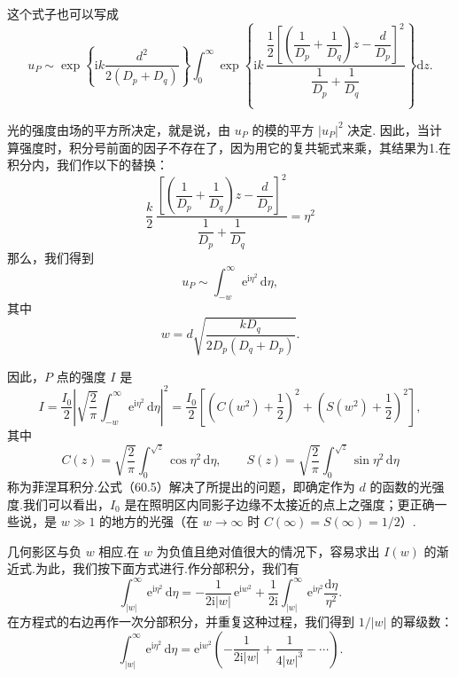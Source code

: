 这个式子也可以写成
\begin{equation}
  u_P\sim\exp\left\{\mathrm{i}k\frac{d^2}{2(D_p+D_q)}\right\}
  \int_0^{\infty}\exp\left\{\mathrm{i}k\,
  \frac{\dfrac{1}{2}\left[\left(\dfrac{1}{D_p}+\dfrac{1}{D_q}\right)z-\dfrac{d}{D_p}\right]^2}
       {\dfrac{1}{D_p}+\dfrac{1}{D_q}}\right\}\mathrm{d}z.
\end{equation}

光的强度由场的平方所决定，就是说，由 $u_P$ 的模的平方 $|u_P|^2$ 决定. 因此，当计算强度时，积分号前面的因子不存在了，因为用它的复共轭式来乘，其结果为1.在积分内，我们作以下的替换：
\begin{equation*}
  \frac{k}{2}\,
  \frac{\left[\left(\dfrac{1}{D_p}+\dfrac{1}{D_q}\right)z-\dfrac{d}{D_p}\right]^2}
       {\dfrac{1}{D_p}+\dfrac{1}{D_q}}=\eta^2
\end{equation*}
那么，我们得到
\begin{equation}
  u_P\sim\int_{-w}^{\infty}\mathrm{e}^{\mathrm{i}\eta^2}\,\mathrm{d}\eta,
\end{equation}
其中
\begin{equation}
  w=d\sqrt{\frac{kD_q}{2D_p(D_q+D_p)}}.
\end{equation}

因此，$P$ 点的强度 $I$ 是
\begin{equation}
  I=\frac{I_0}{2}\left|\sqrt{\frac{2}{\pi}}
  \int_{-w}^{\infty}\mathrm{e}^{\mathrm{i}\eta^2}\,\mathrm{d}\eta\right|^2
  =\frac{I_0}{2}\left[\left(C(w^2)+\frac{1}{2}\right)^2
  +\left(S(w^2)+\frac{1}{2}\right)^2\right],
\end{equation}
其中
\begin{equation*}
  C(z)=\sqrt{\frac{2}{\pi}}\int_0^{\sqrt{z}}\cos\eta^2\,\mathrm{d}\eta,\qquad
  S(z)=\sqrt{\frac{2}{\pi}}\int_0^{\sqrt{z}}\sin\eta^2\,\mathrm{d}\eta
\end{equation*}
称为菲涅耳积分.公式（60.5）解决了所提出的问题，即确定作为 $d$ 的函数的光强度.我们可以看出，$I_0$ 是在照明区内同影子边缘不太接近的点上之强度；更正确一些说，是 $w\gg 1$ 的地方的光强（在 $w\to\infty$ 时 $C(\infty)=S(\infty)=1/2$）.

几何影区与负 $w$ 相应.在 $w$ 为负值且绝对值很大的情况下，容易求出 $I(w)$ 的渐近式.为此，我们按下面方式进行.作分部积分，我们有
\begin{equation*}
  \int_{|w|}^{\infty}\mathrm{e}^{\mathrm{i}\eta^2}\,\mathrm{d}\eta
  =-\frac{1}{2\mathrm{i}|w|}\,\mathrm{e}^{\mathrm{i}w^2}
  +\frac{1}{2\mathrm{i}}\int_{|w|}^{\infty}\mathrm{e}^{\mathrm{i}\eta^2}
  \frac{\mathrm{d}\eta}{\eta^2}.
\end{equation*}
在方程式的右边再作一次分部积分，并重复这种过程，我们得到 $1/|w|$ 的幂级数：
\begin{equation}
  \int_{|w|}^{\infty}\mathrm{e}^{\mathrm{i}\eta^2}\,\mathrm{d}\eta
  =\mathrm{e}^{\mathrm{i}w^2}\left(-\frac{1}{2\mathrm{i}|w|}
  +\frac{1}{4|w|^3}-\cdots\right).
\end{equation}


